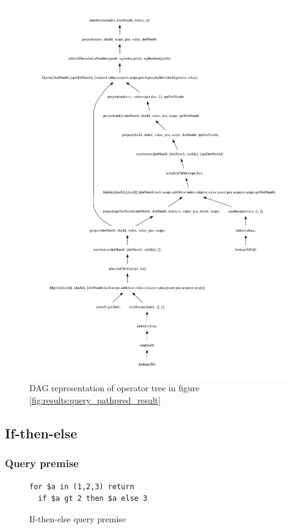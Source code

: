 \begin{figure}[!htp]
\begin{center}
  \includegraphics[width=1.0\textwidth]{img/graphs/TD_patExprPred_dag}
  \caption{DAG representation of operator tree in figure
  \ref{fig:results:query_pathpred_result}}
  \label{fig:results:query_pathpred_result_dag}
\end{center}
\end{figure}

\subsection{If-then-else}
\subsubsection{Query premise}
\begin{figure}[!htp]
\begin{center}
\begin{Verbatim}
for $a in (1,2,3) return
  if $a gt 2 then $a else 3
\end{Verbatim}
  \caption{If-then-else query premise}
  \label{fig:results:query_ifthenelse}
\end{center}
\end{figure}

